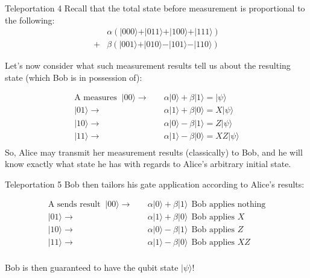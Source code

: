 \documentclass[11pt]{beamer}
\begin{document}
\begin{frame}{Teleportation 4}\small
Recall that the total state before measurement is proportional to the following:
\begin{align*}
& \alpha(\vert 000\rangle+\vert 011\rangle+\vert 100\rangle+\vert 111\rangle) \\
+& \beta (\vert 001\rangle + \vert 010\rangle-\vert 101\rangle - \vert 110\rangle)
\end{align*}
\pause

Let's now consider what such measurement results tell us about the resulting state (which Bob is in possession of):

\begin{align*}
\text{A measures } \ \vert 00\rangle\rightarrow\quad & \alpha \vert 0 \rangle+\beta \vert 1 \rangle = \vert \psi \rangle\\
\vert 01\rangle\rightarrow \quad & \alpha \vert 1 \rangle+\beta \vert 0 \rangle =X \vert \psi \rangle\\
\vert 10\rangle\rightarrow \quad & \alpha \vert 0 \rangle - \beta \vert 1\rangle= Z \vert \psi \rangle \\
\vert 11\rangle\rightarrow \quad & \alpha \vert 1 \rangle - \beta \vert 0\rangle = XZ \vert \psi \rangle\\
\end{align*}\pause
So, Alice may transmit her measurement results (classically) to Bob, and he will know exactly what state he has with regards to Alice's arbitrary initial state. 
\end{frame}

\begin{frame}{Teleportation 5}
Bob then tailors his gate application according to Alice's results:
\pause

\begin{align*}
\text{A sends result } \ \vert 00\rangle\rightarrow\quad & \alpha \vert 0 \rangle+\beta \vert 1 \rangle \ \  \text{Bob applies nothing}\\
\vert 01\rangle\rightarrow \quad & \alpha \vert 1 \rangle+\beta \vert 0 \rangle \ \  \text{Bob applies } X\\
\vert 10\rangle\rightarrow \quad & \alpha \vert 0 \rangle - \beta \vert 1\rangle \ \  \text{Bob applies } Z \\
\vert 11\rangle\rightarrow \quad & \alpha \vert 1 \rangle - \beta \vert 0\rangle  \ \  \text{Bob applies } XZ\\
\end{align*}

\pause
Bob is then guaranteed to have the qubit state $\vert \psi \rangle$!
\end{frame}
\end{document}
